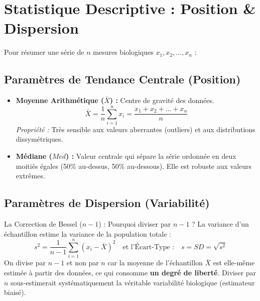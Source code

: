 \documentclass[11pt,a4paper]{article}
\begin{document}
\section{Statistique Descriptive : Position \& Dispersion}

Pour résumer une série de $n$ mesures biologiques $x_1, x_2, \dots, x_n$ :

\subsection{Paramètres de Tendance Centrale (Position)}
\begin{itemize}[leftmargin=*, label=\faCircle]
  \item \textbf{Moyenne Arithmétique ($\bar{X}$) :} Centre de gravité des données.
  \begin{equation*}
    \bar{X} = \frac{1}{n}\sum_{i=1}^n x_i = \frac{x_1 + x_2 + \dots + x_n}{n}
  \end{equation*}
  \textit{Propriété :} Très sensible aux valeurs aberrantes (outliers) et aux distributions dissymétriques.
  \item \textbf{Médiane ($Med$) :} Valeur centrale qui sépare la série ordonnée en deux moitiés égales (50\% au-dessus, 50\% au-dessous). Elle est robuste aux valeurs extrêmes.
\end{itemize}

\subsection{Paramètres de Dispersion (Variabilité)}
\begin{conceptbox}{La Correction de Bessel ($n-1$) : Pourquoi diviser par $n-1$ ?}
La variance d'un échantillon estime la variance de la population totale :
\begin{equation*}
s^2 = \frac{1}{n-1}\sum_{i=1}^n (x_i - \bar{X})^2 \quad \text{et l'Écart-Type :} \quad s = SD = \sqrt{s^2}
\end{equation*}
On divise par $n-1$ et non par $n$ car la moyenne de l'échantillon $\bar{X}$ est elle-même estimée à partir des données, ce qui consomme \textbf{un degré de liberté}. Diviser par $n$ sous-estimerait systématiquement la véritable variabilité biologique (estimateur biaisé).
\end{conceptbox}
\end{document}
